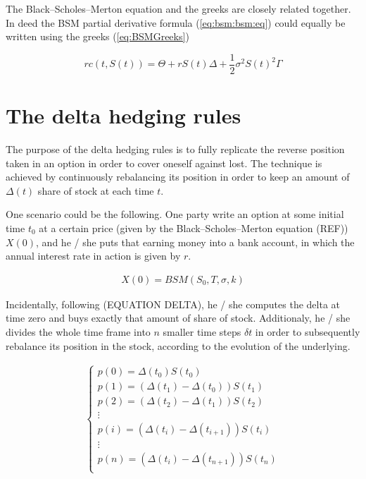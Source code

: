 \documentclass[12pt]{report}
\newcommand{\call}[2]{c\left( #1, #2\right)}
\newcommand{\St}{S\left(t\right)}
\newcommand{\BSMGreeks}[1]{r\call{t}{#1} = \Theta + r #1 \Delta + \frac{1}{2} \sigma ^2 #1 ^2 \Gamma}
\begin{document}
The Black--Scholes--Merton equation and the greeks are closely related together.
In deed the BSM partial derivative formula (\ref{eq:bsm:bsm:eq}) could equally be written using the greeks (\ref{eq:BSMGreeks})

\begin{center}
  \begin{equation}
    \BSMGreeks{\St}
    \label{eq:BSMGreeks}
  \end{equation}
\end{center}



\section{The delta hedging rules}
\label{sec:bsm:delta:hedge}

The purpose of the delta hedging rules is to fully replicate the reverse position taken in an option in order to cover oneself against lost. The technique is achieved by continuously rebalancing its position in order to keep an amount of $\Delta(t)$ share of stock at each time $t$.

One scenario could be the following. One party write an option at some initial time $t_0$ at a certain price (given by the Black--Scholes--Merton equation (REF)) $X(0)$, and he / she puts that earning money into a bank account, in which the annual interest rate in action is given by $r$.

\begin{align}
X(0) = BSM(S_0, T, \sigma, k)
\end{align}

Incidentally, following (EQUATION DELTA), he / she computes the delta at time zero and buys exactly that amount of share of stock. Additionaly, he / she divides the whole time frame into $n$ smaller time steps $\delta t$ in order to subsequently rebalance its position in the stock, according to the evolution of the underlying.

\begin{align}
\left\{
  \begin{array}{l}
    p(0) = \Delta(t_0) S(t_0) \\
    p(1) = \left(\Delta(t_1) - \Delta(t_0) \right) S(t_1) \\
    p(2) = \left(\Delta(t_2) - \Delta(t_1) \right) S(t_2) \\
    \vdots \\
    p(i) = \left(\Delta(t_i) - \Delta(t_{i + 1}) \right) S(t_i) \\
    \vdots \\
    p(n) = \left(\Delta(t_i) - \Delta(t_{n + 1}) \right) S(t_n) \\
  \end{array}
\right.
\end{align}
\end{document}
